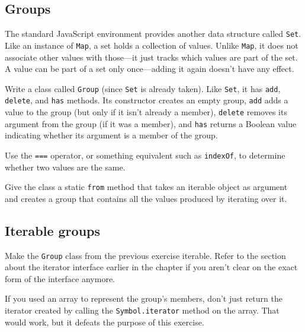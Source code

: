\subsection{Groups}

\label{object.groups}The standard JavaScript environment provides another data structure called \lstinline`Set`. Like an instance of \lstinline`Map`, a set holds a collection of values. Unlike \lstinline`Map`, it does not associate other values with those—it just tracks which values are part of the set. A value can be part of a set only once—adding it again doesn't have any effect.

Write a class called \lstinline`Group` (since \lstinline`Set` is already taken). Like \lstinline`Set`, it has \lstinline`add`, \lstinline`delete`, and \lstinline`has` methods. Its constructor creates an empty group, \lstinline`add` adds a value to the group (but only if it isn't already a member), \lstinline`delete` removes its argument from the group (if it was a member), and \lstinline`has` returns a Boolean value indicating whether its argument is a member of the group.

Use the \lstinline`===` operator, or something equivalent such as \lstinline`indexOf`, to determine whether two values are the same.

Give the class a static \lstinline`from` method that takes an iterable object as argument and creates a group that contains all the values produced by iterating over it.

\subsection{Iterable groups}

\label{object.group_iterator}Make the \lstinline`Group` class from the previous exercise iterable. Refer to the section about the iterator interface earlier in the chapter if you aren't clear on the exact form of the interface anymore.

If you used an array to represent the group's members, don't just return the iterator created by calling the \lstinline`Symbol.iterator` method on the array. That would work, but it defeats the purpose of this exercise.


